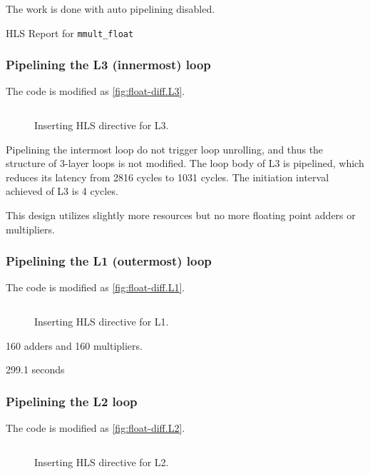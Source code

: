 The work is done with auto pipelining disabled.

\begin{table}
    \centering
    \caption{HLS Report for \texttt{mmult\_float}}\label{tab:float1}
    
\end{table}

\subsubsection{Pipelining the L3 (innermost) loop}\label{sec:1bL3}

The code is modified as \autoref{fig:float-diff.L3}.

\begin{figure}[h!]
    \centering
    \inputminted{diff}{program/diff.L3}
    \caption{Inserting HLS directive for L3.}\label{fig:float-diff.L3}
\end{figure}

Pipelining the intermost loop do not trigger loop unrolling,
and thus the structure of 3-layer loops is not modified.
The loop body of L3 is pipelined, which reduces its latency
from 2816 cycles to 1031 cycles.
The initiation interval achieved of L3 is 4 cycles.

This design utilizes slightly more resources but no more floating point
adders or multipliers.


\subsubsection{Pipelining the L1 (outermost) loop}\label{sec:1bL1}

The code is modified as \autoref{fig:float-diff.L1}.

\begin{figure}[h!]
    \centering
    \inputminted{diff}{program/diff.L1}
    \caption{Inserting HLS directive for L1.}\label{fig:float-diff.L1}
\end{figure}


160 adders and 160 multipliers.

299.1 seconds

\subsubsection{Pipelining the L2 loop}\label{sec:1bL2}

The code is modified as \autoref{fig:float-diff.L2}.

\begin{figure}[h!]
    \centering
    \inputminted{diff}{program/diff.L2}
    \caption{Inserting HLS directive for L2.}\label{fig:float-diff.L2}
\end{figure}

